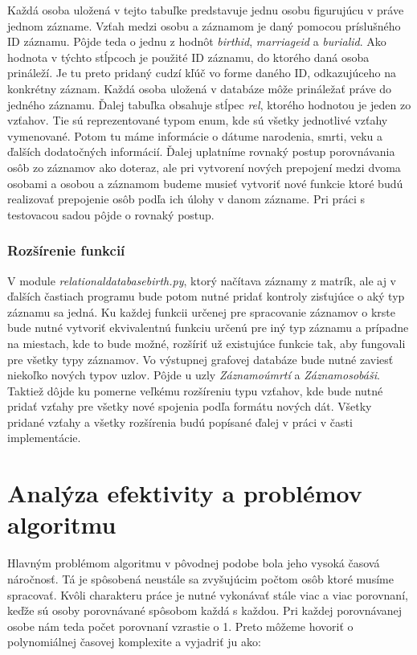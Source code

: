 Každá osoba uložená v tejto tabuľke predstavuje jednu osobu figurujúcu v práve jednom zázname. Vzťah medzi osobu a záznamom je daný pomocou príslušného ID záznamu. Pôjde teda o jednu z hodnôt \textit{birth\textunderscore id}, \textit{marriage\textunderscore id} a \textit{burial\textunderscore id}. Ako hodnota v týchto stĺpcoch je použité ID záznamu, do ktorého daná osoba prináleží. Je tu preto pridaný cudzí kľúč vo forme daného ID, odkazujúceho na konkrétny záznam. Každá osoba uložená v databáze môže prináležať práve do jedného záznamu. Ďalej tabuľka obsahuje stĺpec \textit{rel}, ktorého hodnotou je jeden zo vzťahov. Tie sú reprezentované typom enum, kde sú všetky jednotlivé vzťahy vymenované. Potom tu máme informácie o dátume narodenia, smrti, veku a ďalších dodatočných informácií.
Ďalej uplatníme rovnaký postup porovnávania osôb zo záznamov ako doteraz, ale pri vytvorení nových prepojení medzi dvoma osobami a osobou a záznamom budeme musieť vytvoriť nové funkcie ktoré budú realizovať prepojenie osôb podľa ich úlohy v danom zázname. Pri práci s testovacou sadou pôjde o rovnaký postup.

\subsubsection{Rozšírenie funkcií}

V module \textit{relational\textunderscore database\textunderscore birth.py}, ktorý načítava záznamy z matrík, ale aj v ďalších častiach
programu bude potom nutné pridať kontroly zisťujúce o aký typ záznamu sa jedná. Ku každej funkcii určenej pre spracovanie záznamov o krste bude nutné vytvoriť ekvivalentnú funkciu určenú pre iný typ záznamu a prípadne na miestach, kde to bude možné, rozšíriť už existujúce funkcie tak, aby fungovali pre všetky typy záznamov. Vo výstupnej grafovej
databáze bude nutné zaviesť niekoľko nových typov uzlov. Pôjde u uzly \textit{Záznam\textunderscore o\textunderscore úmrtí} a \textit{Záznam\textunderscore o\textunderscore sobáši}. Taktiež dôjde ku pomerne veľkému rozšíreniu typu vzťahov, kde bude
nutné pridať vzťahy pre všetky nové spojenia podľa formátu nových dát. Všetky pridané vzťahy a všetky rozšírenia budú popísané ďalej v práci v časti implementácie.
\nocite{*}

\section{Analýza efektivity a problémov algoritmu}

Hlavným problémom algoritmu v pôvodnej podobe bola jeho vysoká časová náročnosť. Tá je spôsobená neustále sa zvyšujúcim počtom osôb ktoré musíme spracovať. Kvôli charakteru práce je nutné vykonávať stále viac a viac porovnaní, keďže sú osoby porovnávané spôsobom každá s každou. Pri každej porovnávanej osobe nám teda počet porovnaní vzrastie o 1. Preto môžeme hovoriť o polynomiálnej časovej komplexite a vyjadriť ju ako:

